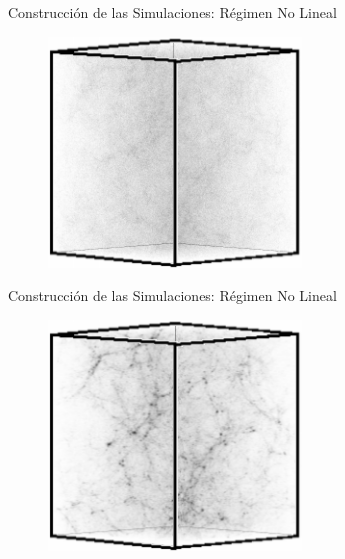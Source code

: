 \documentclass[8pt,fleqn]{beamer}
\begin{document}
\begin{frame}
\begin{block}{Construcción de las Simulaciones: Régimen No Lineal}\justifying

\begin{figure}[htbp]
	\centering
	\includegraphics[trim = 0mm 0mm 0mm 0mm, clip, width=0.6\textwidth]
	{./figures/Nonlinear1.png}
\end{figure}

\end{block}
\end{frame}
\begin{frame}
\begin{block}{Construcción de las Simulaciones: Régimen No Lineal}\justifying

\begin{figure}[htbp]
	\centering
	\includegraphics[trim = 0mm 0mm 0mm 0mm, clip, width=0.6\textwidth]
	{./figures/Nonlinear2.png}
\end{figure}

\end{block}
\end{frame}
\end{document}
